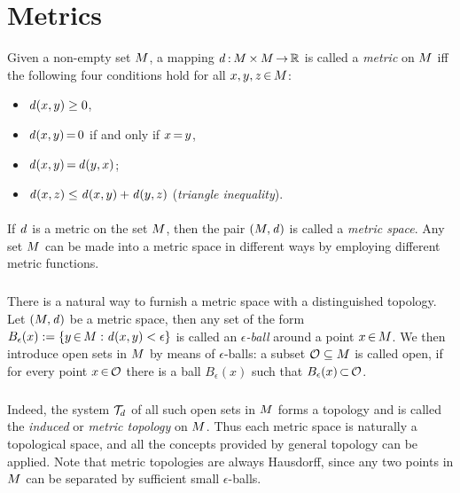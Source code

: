 \documentclass[11pt,twoside]{article}
\begin{document}
\section{Metrics}                                                              %
Given a non-empty set $M$,
a mapping $\mathit{d} {\,:\,} M {\,\times\,} M {\,\to\,} {\mathbb{R}}$ is called a \textit{metric}
on $M$
iff the following four conditions hold for all $x,y,z {\,\in\,} M$:

\begin{itemize}[leftmargin=17mm,itemsep=1pt]
\item[(M-1)]
$\mathit{d}(x,y) \geq 0$,

\item[(M-2)]
$\mathit{d}(x,y) {\,=\,} 0$ if and only if $x {\,=\,} y$,

\item[(M-3)]
$\mathit{d}(x,y) {\,=\,} \mathit{d}(y,x)$;

\item[(M-4)]
$\mathit{d}(x,z) \leq \mathit{d}(x,y) + \mathit{d}(y,z)$ \hspace{3mm}(\textit{triangle inequality}).
\end{itemize}

\paragraph{} %
If $\mathit{d}$ is a metric on the set $M$,
then the pair $(M,\mathit{d})$ is called a \textit{metric space}.
Any set $M$ can be made into a metric space in different ways
by employing different metric functions.

\subparagraph{}
There is a natural way to furnish a metric space with a distinguished topology.
Let $(M,\mathit{d})$ be a metric space,
then any set of the form
$
B_{\epsilon}(x) := \{y {\,\in\,} M: \mathit{d}(x,y) < \epsilon \}
$
is called an \textit{$\epsilon$-ball} around a point $x {\,\in\,} M$.
We then introduce open sets in $M$ by means of $\epsilon$-balls:
a subset $\mathcal{O} \subseteq M$ is called open,
if for every point $x {\,\in\,} \mathcal{O}$
there is a ball $B_{\epsilon}(x)$
such that $B_{\epsilon}(x) {\,\subset\,} \mathcal{O}$.

\subparagraph{}
Indeed,
the system $\mathcal{T}_d$ of all such open sets in $M$ forms a topology
and is called the \textit{induced} or \textit{metric topology} on $M$.
Thus each metric space is naturally a topological space,
and all the concepts provided by general topology can be applied.
Note that metric topologies are always Hausdorff,
since any two points in $M$ can be separated
by sufficient small $\epsilon$-balls.
\end{document}
